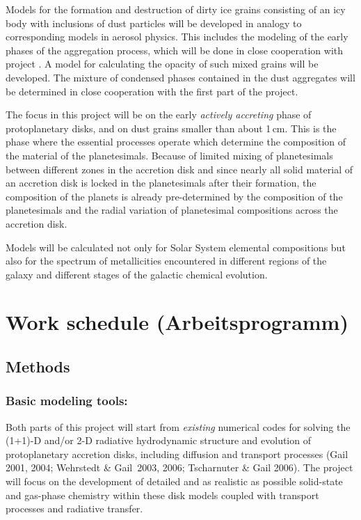 Models for the formation and destruction of dirty ice grains
consisting of an icy body with inclusions of dust particles will
be developed in analogy to corresponding models in aerosol
physics. This includes the modeling of the early phases of the
aggregation process, which will be done in close cooperation with
project \projdul. A model for calculating the opacity of such
mixed grains will be developed. The mixture of condensed phases
contained in the dust aggregates will be determined in close
cooperation with the first part of the project.

The focus in this project will be on the early {\em actively
accreting} phase of protoplanetary disks, and on dust grains
smaller than about 1\,cm. This is the phase where the essential
processes operate which determine the composition of the material
of the planetesimals. Because of limited mixing of planetesimals
between different zones in the accretion disk and since nearly all
solid material of an accretion disk is locked in the planetesimals
after their formation, the composition of the planets is already
pre-determined by the composition of the planetesimals and the
radial variation of planetesimal compositions across the accretion
disk.

Models will be calculated not only for Solar System elemental
compositions but also for the spectrum of metallicities
encountered in different regions of the galaxy and different
stages of the galactic chemical evolution.


\section{Work schedule (Arbeitsprogramm)}

\subsection{Methods}

\subsubsection{Basic modeling tools:}
%
Both parts of this project will start from \emph{existing}
numerical codes for solving the (1+1)-D and/or 2-D radiative
hydrodynamic structure and evolution of protoplanetary accretion
disks, including diffusion and transport processes (Gail 2001,
2004; Wehrstedt \& Gail~2003, 2006; Tscharnuter \& Gail 2006). The
project will focus on the development of detailed and as realistic
as possible solid-state and gas-phase chemistry within these disk
models coupled with transport processes and radiative transfer.


